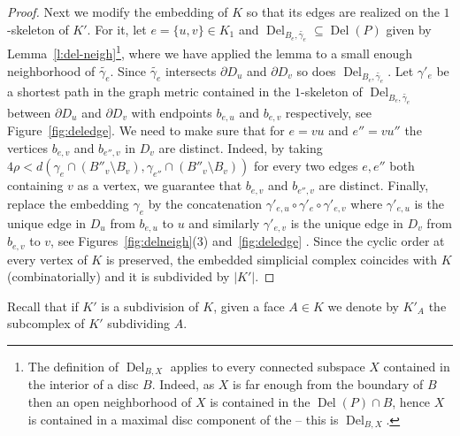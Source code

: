 \documentclass[reqno,english]{amsart}
\numberwithin{claimcounter}{theorem}
\theoremstyle{remark}
\theoremstyle{definition}
\numberwithin{theorem}{section}
\DeclareMathOperator{\Del}{Del}
\begin{document}
\begin{proof}
    Next we modify the embedding of $K$ 
    so that its edges are realized on the $1$-skeleton of $K'$.
    For it, let $e=\{u,v\}\in K_1$ and $\Del_{B_e,\widetilde{\gamma_e}} \subseteq \Del(P)$ given by Lemma~\ref{l:del-neigh}\footnote{The definition of $\Del_{B,X}$ applies to every connected subspace $X$ contained in the interior of a disc $B$. Indeed, as $X$ is far enough from the boundary of $B$ then an open neighborhood of $X$ is contained in the  $\Del(P)\cap B$, hence $X$ is contained in a maximal disc component of the  -- this is $\Del_{B,X}$.}, where we have applied the lemma to a small enough neighborhood of $\widetilde{\gamma_e}$. 
    Since $\widetilde{\gamma_e}$ intersects $\partial D_u$ and $\partial D_v$ so does $\Del_{B_e,\widetilde{\gamma_e}}$. Let $\gamma'_e$  be a shortest path in the graph metric contained in the $1$-skeleton of $\Del_{B_e,\widetilde{\gamma_e}}$ between $\partial D_u$ and $\partial D_v$ with endpoints $b_{e,u}$ and $b_{e,v}$ respectively, see Figure~\ref{fig:deledge}. 
We need to make sure that for $e=vu$ and $e''=vu''$ the vertices $b_{e,v}$ and $b_{e'',v}$ in $D_v$ are distinct. Indeed, by taking $4\rho< d(\gamma_e\cap(B''_v\setminus B_v), \gamma_{e''}\cap(B''_v\setminus B_v))$ for every two edges $e,e''$ both containing $v$ as a vertex, we guarantee that $b_{e,v}$ and $b_{e'',v}$ are distinct.
    Finally, replace the embedding $\gamma_e$ by the concatenation $\gamma'_{e,u}\circ \gamma'_e\circ \gamma'_{e,v}$ where $\gamma'_{e,u}$ is the unique 
    edge in $D_u$ from $b_{e,u}$ to $u$ and similarly $\gamma'_{e,v}$ is the unique 
    edge in $D_v$ from $b_{e,v}$ to $v$, see Figures~\ref{fig:delneigh}(3) and~\ref{fig:deledge} . Since the cyclic order at every vertex of $K$ is preserved, the embedded simplicial complex coincides with $K$ (combinatorially) and it is subdivided by $|K'|$.
\end{proof}


Recall that if $K'$ is a subdivision of $K$, given a face $A\in K$ we denote by $K'_A$ the subcomplex of $K'$ subdividing $A$.
\end{document}
